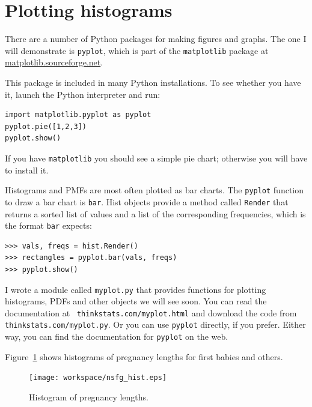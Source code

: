 \documentclass[12pt]{book}
\begin{document}
\section{Plotting histograms}


There are a number of Python packages for making figures and graphs.
The one I will demonstrate is {\tt pyplot}, which is part of
the {\tt matplotlib} package at \url{matplotlib.sourceforge.net}.

This package is included in many Python installations.  To see whether
you have it, launch the Python interpreter and run:

\begin{verbatim}
import matplotlib.pyplot as pyplot
pyplot.pie([1,2,3])
pyplot.show()
\end{verbatim}

If you have {\tt matplotlib} you should see a simple pie chart;
otherwise you will have to install it.


Histograms and PMFs are most often plotted as bar charts.  The
{\tt pyplot} function to draw a bar chart is {\tt bar}.  Hist
objects provide a method called {\tt Render} that returns a sorted
list of values and a list of the corresponding frequencies, which
is the format {\tt bar} expects:

\begin{verbatim}
>>> vals, freqs = hist.Render()
>>> rectangles = pyplot.bar(vals, freqs)
>>> pyplot.show()
\end{verbatim}

I wrote a module called {\tt myplot.py} that provides functions
for plotting histograms, PDFs and other objects we will see soon.
You can read the documentation at {\tt
  thinkstats.com/myplot.html} and download the code from {\tt
  thinkstats.com/myplot.py}.  Or you can use
{\tt pyplot} directly, if you prefer.  Either way, you can find
the documentation for {\tt pyplot} on the web.


Figure~\ref{nsfg_hist} shows histograms of pregnancy lengths for
first babies and others.


\begin{figure}
\centerline{\texttt{[image: workspace/nsfg\_hist.eps]}}
\caption{Histogram of pregnancy lengths.}
\label{nsfg_hist}
\end{figure}
\end{document}
